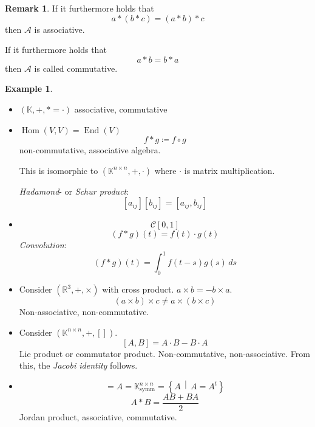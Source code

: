 \documentclass[a4paper,landscape,twocolumn]{article}
\newcommand\setdef[2]{\left\{#1\,\middle|\,#2\right\}}
\theoremstyle{definition}
\newtheorem{ex}{Example}
\newtheorem{rem}{Remark}
\DeclareMathOperator\Hom{Hom} %
\DeclareMathOperator\End{End} %
\begin{document}
\begin{rem}
  \label{bem-8.2}
  If it furthermore holds that
  \[ a * (b * c) = (a * b) * c \]
  then $\mathcal A$ is associative.

  If it furthermore holds that
  \[ a * b = b * a \]
  then $\mathcal A$ is called commutative.
\end{rem}

\begin{ex}
  \label{bsp-9.3}
  \begin{itemize}
    \item $(\mathbb K, +, * = \cdot)$ associative, commutative
    \item $\Hom(V, V) = \End(V)$
      \[ f * g \coloneqq f \circ g \]
      non-commutative, associative algebra.

      This is isomorphic to $(\mathbb K^{n\times n}, +, \cdot)$
      where $\cdot$ is matrix multiplication.

      \emph{Hadamond}- or \emph{Schur product}:
      \[ [a_{ij}] [b_{ij}] = [a_{ij}, b_{ij}] \]
    \item
      \[ \mathcal C[0,1] \]
      \[ (f * g)(t) = f(t) \cdot g(t) \]
      \emph{Convolution}:
      \[ (f * g)(t) = \int_0^1 f(t - s) g(s) \, ds \]
    \item
      Consider $(\mathbb R^3, +, \times)$ with cross product. $a\times b = -b \times a$.
      \[ (a \times b) \times c \neq a \times (b \times c) \]
      Non-associative, non-commutative.
    \item
      Consider $(\mathbb K^{n\times n}, +, [])$.
      \[ [A, B] = A \cdot B - B \cdot A \]
      Lie product or commutator product.
      Non-commutative, non-associative.
      From this, the \emph{Jacobi identity} follows.
    \item
      \[ = A = \mathbb K_{\text{symm}}^{n\times n} = \setdef{A}{A = A^t} \]
      \[ A * B = \frac{AB + BA}{2} \]
      Jordan product, associative, commutative.
  \end{itemize}
\end{ex}
\end{document}
